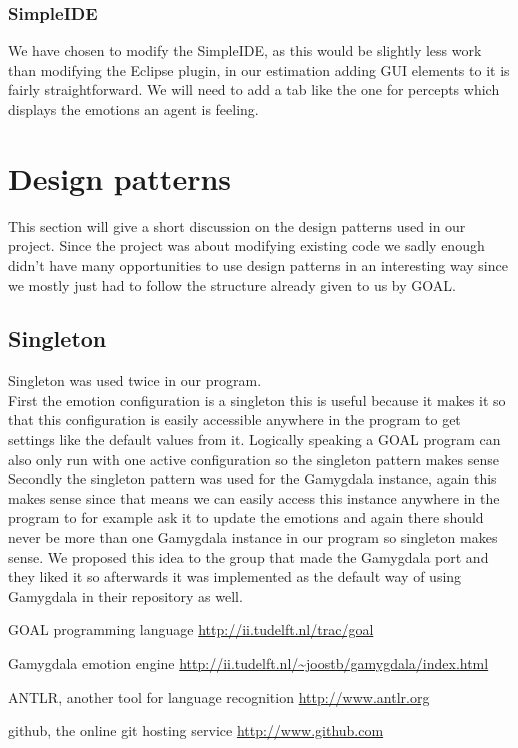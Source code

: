 \documentclass[]{article}
\begin{document}
\subsubsection{SimpleIDE}
We have chosen to modify the SimpleIDE, as this would be slightly less work than modifying the Eclipse plugin, in our estimation adding GUI elements to it is fairly straightforward. We will need to add a tab like the one for percepts which displays the emotions an agent is feeling.

\section{Design patterns}
This section will give a short discussion on the design patterns used in our project. Since the project was about modifying existing code we sadly enough didn't have many opportunities to use design patterns in an interesting way since we mostly just had to follow the structure already given to us by GOAL.

\subsection{Singleton}
Singleton was used twice in our program.
\\First the emotion configuration is a singleton this is useful because it makes it so that this configuration is easily accessible anywhere in the program to get settings like the default values from it. Logically speaking a GOAL program can also only run with one active configuration so the singleton pattern makes sense \\ 
Secondly the singleton pattern was used for the Gamygdala instance, again this makes sense since that means we can easily access this instance anywhere in the program to for example ask it to update the emotions and again there should never be more than one Gamygdala instance in our program so singleton makes sense. We proposed this idea to the group that made the Gamygdala port and they liked it so afterwards it was implemented as the default way of using Gamygdala in their repository as well.



\clearpage
\printglossaries
\begin{thebibliography}{9}
	
	GOAL programming language
	\url{http://ii.tudelft.nl/trac/goal}
	
	Gamygdala emotion engine
	\url{http://ii.tudelft.nl/~joostb/gamygdala/index.html}
	
	ANTLR, another tool for language recognition
	\url{http://www.antlr.org}

	github, the online git hosting service
	\url{http://www.github.com}
	
	
\end{thebibliography}
\end{document}
